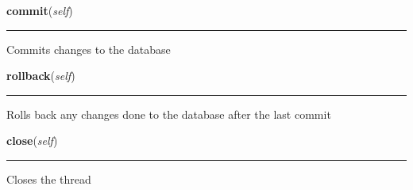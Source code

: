     \label{DBE:DBE:commit}

    \vspace{0.5ex}

\hspace{.8\funcindent}\begin{boxedminipage}{\funcwidth}

    \raggedright \textbf{commit}(\textit{self})

    \vspace{-1.5ex}

    \rule{\textwidth}{0.5\fboxrule}
\setlength{\parskip}{2ex}
    Commits changes to the database

\setlength{\parskip}{1ex}
    \end{boxedminipage}

    \label{DBE:DBE:rollback}

    \vspace{0.5ex}

\hspace{.8\funcindent}\begin{boxedminipage}{\funcwidth}

    \raggedright \textbf{rollback}(\textit{self})

    \vspace{-1.5ex}

    \rule{\textwidth}{0.5\fboxrule}
\setlength{\parskip}{2ex}
    Rolls back any changes done to the database after the last commit

\setlength{\parskip}{1ex}
    \end{boxedminipage}

    \label{DBE:DBE:close}

    \vspace{0.5ex}

\hspace{.8\funcindent}\begin{boxedminipage}{\funcwidth}

    \raggedright \textbf{close}(\textit{self})

    \vspace{-1.5ex}

    \rule{\textwidth}{0.5\fboxrule}
\setlength{\parskip}{2ex}
    Closes the thread

\setlength{\parskip}{1ex}
    \end{boxedminipage}

